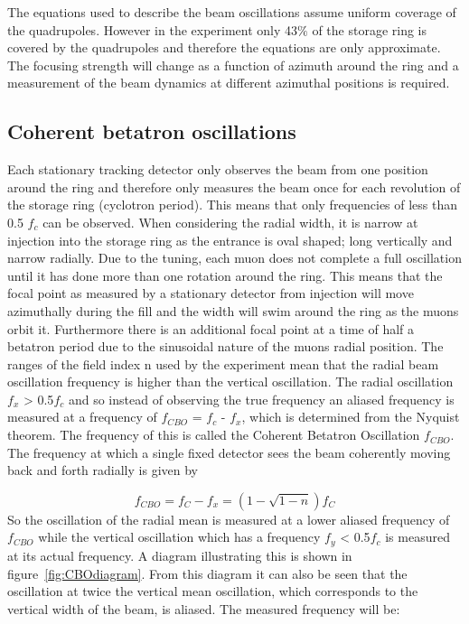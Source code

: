 The equations used to describe the beam oscillations assume uniform coverage of the quadrupoles. However in the experiment only 43$\%$ of the storage ring is covered by the quadrupoles and therefore the equations are only approximate. The focusing strength will change as a function of azimuth around the ring and a measurement of the beam dynamics at different azimuthal positions is required.

\subsection{Coherent betatron oscillations}

Each stationary tracking detector only observes the beam from one position around the ring and therefore only measures the beam once for each revolution of the storage ring (cyclotron period). This means that only frequencies of less than 0.5 $f_{c}$ can be observed. When considering the radial width, it is narrow at injection into the storage ring as the entrance is oval shaped; long vertically and narrow radially. Due to the tuning, each muon does not complete a full oscillation until it has done more than one rotation around the ring. This means that the focal point as measured by a stationary detector from injection will move azimuthally during the fill and the width will swim around the ring as the muons orbit it. Furthermore there is an additional focal point at a time of half a betatron period due to the sinusoidal nature of the muons radial position.
The ranges of the field index n used by the experiment mean that the radial beam oscillation frequency is higher than the vertical oscillation. The radial oscillation $f_{x}$ > 0.5$f_{c}$ and so instead of observing the true frequency an aliased frequency is measured at a frequency of $f_{CBO}$ = $f_{c}$ - $f_{x}$, which is determined from the Nyquist theorem. The frequency of this is called the Coherent Betatron Oscillation $f_{CBO}$. 
The frequency at which a single fixed detector sees the beam coherently moving back and forth radially is given by

\begin{equation}
f_{CBO} = f_{C} - f_{x} = (1 - \sqrt{1-n})f_{C}
\end{equation}
So the oscillation of the radial mean is measured at a lower aliased frequency of $f_{CBO}$ while the vertical oscillation which has a frequency $f_{y}$ < 0.5$f_{c}$ is measured at its actual frequency. A diagram illustrating this is shown in figure~\ref{fig:CBOdiagram}. From this diagram it can also be seen that the oscillation at twice the vertical mean oscillation, which corresponds to the vertical width of the beam, is aliased. The measured frequency will be: 

